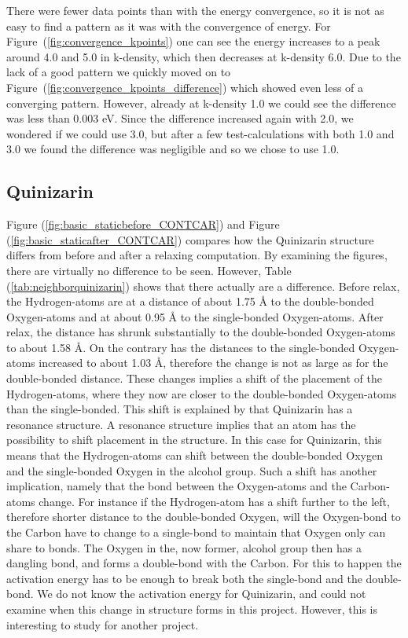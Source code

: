 \documentclass{article}
\begin{document}
    There were fewer data points than with the energy convergence, so it is not as easy to find a pattern as it was with the convergence of energy. For Figure~(\ref{fig:convergence_kpoints}) one can see the energy increases to a peak around 4.0 and 5.0 in k-density, which then decreases at k-density 6.0. Due to the lack of a good pattern we quickly moved on to Figure~(\ref{fig:convergence_kpoints_difference}) which showed even less of a converging pattern. However, already at k-density 1.0 we could see the difference was less than 0.003 eV. Since the difference increased again with 2.0, we wondered if we could use 3.0, but after a few test-calculations with both 1.0 and 3.0 we found the difference was negligible and so we chose to use 1.0. \\


  \subsection{Quinizarin}

    Figure (\ref{fig:basic_staticbefore_CONTCAR}) and Figure (\ref{fig:basic_staticafter_CONTCAR}) compares how the Quinizarin structure differs from before and after a relaxing computation. By examining the figures, there are virtually no difference to be seen. However, Table (\ref{tab:neighborquinizarin}) shows that there actually are a difference. Before relax, the Hydrogen-atoms are at a distance of about 1.75 Å to the double-bonded Oxygen-atoms and at about 0.95 Å to the single-bonded Oxygen-atoms. After relax, the distance has shrunk substantially to the double-bonded Oxygen-atoms to about 1.58 Å. On the contrary has the distances to the single-bonded Oxygen-atoms increased to about 1.03 Å, therefore the change is not as large as for the double-bonded distance. These changes implies a shift of the placement of the Hydrogen-atoms, where they now are closer to the double-bonded Oxygen-atoms than the single-bonded. This shift is explained by that Quinizarin has a resonance structure. A resonance structure implies that an atom has the possibility to shift placement in the structure. In this case for Quinizarin, this means that the Hydrogen-atoms can shift between the double-bonded Oxygen and the single-bonded Oxygen in the alcohol group. Such a shift has another implication, namely that the bond between the Oxygen-atoms and the Carbon-atoms change. For instance if the Hydrogen-atom has a shift further to the left, therefore shorter distance to the double-bonded Oxygen, will the Oxygen-bond to the Carbon have to change to a single-bond to maintain that Oxygen only can share to bonds. The Oxygen in the, now former, alcohol group then has a dangling bond, and forms a double-bond with the Carbon. For this to happen the activation energy has to be enough to break both the single-bond and the double-bond. We do not know the activation energy for Quinizarin, and could not examine when this change in structure forms in this project. However, this is interesting to study for another project. \\
\end{document}
